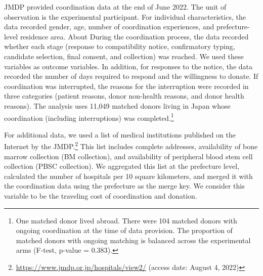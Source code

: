 \documentclass[
  11pt,
  a4paper
]{article}
\begin{document}
JMDP provided coordination data at the end of June 2022. The unit of observation is the experimental participant. For individual characteristics, the data recorded gender, age, number of coordination experiences, and prefecture-level residence area. About During the coordination process, the data recorded whether each stage (response to compatibility notice, confirmatory typing, candidate selection, final consent, and collection) was reached. We used these variables as outcome variables. In addition, for responses to the notice, the data recorded the number of days required to respond and the willingness to donate. If coordination was interrupted, the reasons for the interruption were recorded in three categories (patient reasons, donor non-health reasons, and donor health reasons). The analysis uses 11,049 matched donors living in Japan whose coordination (including interruptions) was completed.\footnote{One matched donor lived abroad. There were 104 matched donors with ongoing coordination at the time of data provision. The proportion of matched donors with ongoing matching is balanced across the experimental arms (F-test, p-value = \(0.383\)).}

For additional data, we used a list of medical institutions published on the Internet by the JMDP.\footnote{\url{https://www.jmdp.or.jp/hospitals/view2/} (access date: August 4, 2022)} This list includes complete addresses, availability of bone marrow collection (BM collection), and availability of peripheral blood stem cell collection (PBSC collection). We aggregated this list at the prefecture level, calculated the number of hospitals per 10 square kilometers, and merged it with the coordination data using the prefecture as the merge key. We consider this variable to be the traveling cost of coordination and donation.
\end{document}
